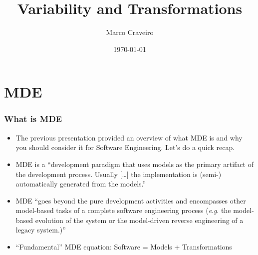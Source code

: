 \documentclass{beamer}
\title{Variability and Transformations}
\author{Marco Craveiro}
\date{\today}
\newcommand{\eg}{\textit{e}.\textit{g}. }
\begin{document}

\section{\ac{MDE}}

\begin{frame}
\frametitle{What is \ac{MDE}}

\begin{itemize}
\item The previous presentation provided an overview of what \acf{MDE}
  is and why you should consider it for Software Engineering. Let's do
  a quick recap.

\pause{}

\item \ac{MDE} is a \enquote{development paradigm that uses models as
  the primary artifact of the development process. Usually [\ldots]
  the implementation is (semi-) automatically generated from the
  models.}\cite{brambilla2012model}

\pause{}

\item \ac{MDE} \enquote{goes beyond the pure development activities
  and encompasses other model-based tasks of a complete software
  engineering process (\eg{} the model-based evolution of the system or
  the model-driven reverse engineering of a legacy
  system.)}\cite{brambilla2012model}

\pause{}

\item \enquote{Fundamental} \ac{MDE} equation: Software = Models +
  Transformations

\end{itemize}

\end{frame}
\end{document}
